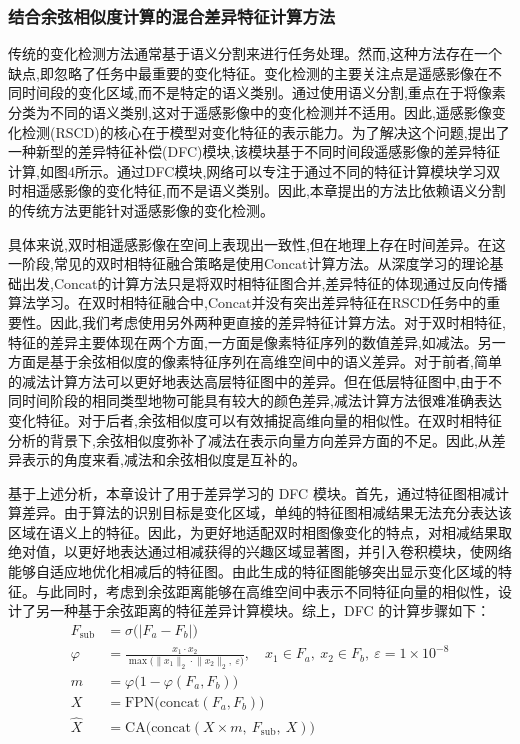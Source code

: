 \subsubsection{结合余弦相似度计算的混合差异特征计算方法}

传统的变化检测方法通常基于语义分割来进行任务处理。然而,这种方法存在一个缺点,即忽略了任务中最重要的变化特征。变化检测的主要关注点是遥感影像在不同时间段的变化区域,而不是特定的语义类别。通过使用语义分割,重点在于将像素分类为不同的语义类别,这对于遥感影像中的变化检测并不适用。因此,遥感影像变化检测(RSCD)的核心在于模型对变化特征的表示能力。为了解决这个问题,提出了一种新型的差异特征补偿(DFC)模块,该模块基于不同时间段遥感影像的差异特征计算,如图4所示。通过DFC模块,网络可以专注于通过不同的特征计算模块学习双时相遥感影像的变化特征,而不是语义类别。因此,本章提出的方法比依赖语义分割的传统方法更能针对遥感影像的变化检测。

具体来说,双时相遥感影像在空间上表现出一致性,但在地理上存在时间差异。在这一阶段,常见的双时相特征融合策略是使用Concat计算方法。从深度学习的理论基础出发,Concat的计算方法只是将双时相特征图合并,差异特征的体现通过反向传播算法学习。在双时相特征融合中,Concat并没有突出差异特征在RSCD任务中的重要性。因此,我们考虑使用另外两种更直接的差异特征计算方法。对于双时相特征,特征的差异主要体现在两个方面,一方面是像素特征序列的数值差异,如减法。另一方面是基于余弦相似度的像素特征序列在高维空间中的语义差异。对于前者,简单的减法计算方法可以更好地表达高层特征图中的差异。但在低层特征图中,由于不同时间阶段的相同类型地物可能具有较大的颜色差异,减法计算方法很难准确表达变化特征。对于后者,余弦相似度可以有效捕捉高维向量的相似性。在双时相特征分析的背景下,余弦相似度弥补了减法在表示向量方向差异方面的不足。因此,从差异表示的角度来看,减法和余弦相似度是互补的。

基于上述分析，本章设计了用于差异学习的 DFC 模块。首先，通过特征图相减计算差异。由于算法的识别目标是变化区域，单纯的特征图相减结果无法充分表达该区域在语义上的特征。因此，为更好地适配双时相图像变化的特点，对相减结果取绝对值，以更好地表达通过相减获得的兴趣区域显著图，并引入卷积模块，使网络能够自适应地优化相减后的特征图。由此生成的特征图能够突出显示变化区域的特征。与此同时，考虑到余弦距离能够在高维空间中表示不同特征向量的相似性，设计了另一种基于余弦距离的特征差异计算模块。综上，DFC 的计算步骤如下：
\begin{align}
F_{\mathrm{sub}} &= \sigma\bigl(\lvert F_a - F_b\rvert\bigr) \label{eq:changeclip-13}\\
\varphi &= \frac{x_1 \cdot x_2}{\max\bigl(\lVert x_1\rVert_2 \cdot \lVert x_2\rVert_2,\ \varepsilon\bigr)},\quad x_1\in F_a,\ x_2\in F_b,\ \varepsilon=1\times10^{-8} \label{eq:changeclip-14}\\
m &= \varphi\bigl(1 - \varphi(F_a, F_b)\bigr) \label{eq:changeclip-15}\\
X &= \mathrm{FPN}\bigl(\mathrm{concat}(F_a, F_b)\bigr) \label{eq:changeclip-16}\\
\hat X &= \mathrm{CA}\bigl(\mathrm{concat}(X \times m,\ F_{\mathrm{sub}},\ X)\bigr) \label{eq:changeclip-17}
\end{align}

